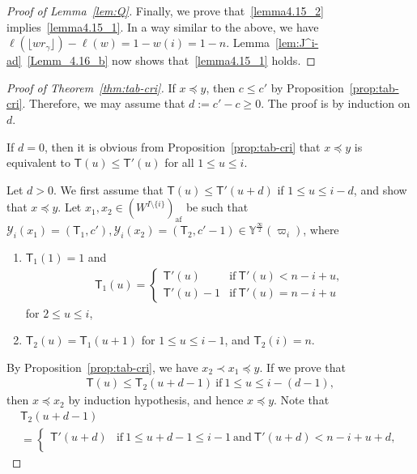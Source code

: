 \documentclass[10pt]{amsart}
\theoremstyle{definition}\newtheorem{defi}[theo]{Definition}
\theoremstyle{remark}\newtheorem{rema}[theo]{Remark}
\newcommand{\si}{\frac{\infty}{2}}
\DeclareMathOperator{\af}{af}
\begin{document}
\begin{proof}[Proof of Lemma~\ref{lem:Q}]
Finally, we prove that~\ref{lemma4.15_2} implies~\ref{lemma4.15_1}. 
In a way similar to the above, 
we have 
$\ell(\lfloor w r_{\gamma} \rfloor) - \ell(w) = 1 - w(i) = 1 - n$. 
Lemma~\ref{lem:J^i-ad}~\ref{Lemm_4.16_b} now shows that~\ref{lemma4.15_1} holds.
\end{proof}

\begin{proof}[Proof of Theorem~\ref{thm:tab-cri}]
If 
$x \preceq y$, 
then 
$c \leq c'$ 
by Proposition~\ref{prop:tab-cri}.
Therefore, we may assume that 
$d := c' - c \geq 0$. 
The proof is by induction on $d$. 

If $d = 0$, then it is obvious from Proposition~\ref{prop:tab-cri} that 
$x \preceq y$ 
is equivalent to 
$\mathsf{T}(u) \leq \mathsf{T}'(u)$
for all 
$1 \leq u \leq i$. 

Let $d > 0$. 
We first assume that 
$\mathsf{T}(u) \leq \mathsf{T}'(u+d)$ 
if 
$1 \leq u \leq i-d$, 
and show that 
$x \preceq y$. 
Let 
$x_1 , x_2 \in (W^{I \setminus \{ i \}})_{\af}$ 
be such that 
$\mathcal{Y}_i(x_1) = (\mathsf{T}_1 , c'), \mathcal{Y}_i(x_2) = (\mathsf{T}_2 , c'-1) \in \mathbb{Y}^{\si}(\varpi_i)$, 
where 
\begin{enumerate}[label=(\arabic*)]
\item
$\mathsf{T}_1(1) = 1$ and 
\begin{align}
\mathsf{T}_1(u) 
=
\begin{cases}
\mathsf{T}'(u) 
&
\text{if} \ 
\mathsf{T}'(u) < n-i+u, \\[2mm]
\mathsf{T}'(u) - 1
&
\text{if} \ 
\mathsf{T}'(u) = n-i+u
\end{cases}
\end{align}
for $2 \leq u \leq i$, 
\item
$\mathsf{T}_2(u) = \mathsf{T}_1(u+1)$ 
for 
$1 \leq u \leq i-1$, 
and 
$\mathsf{T}_2(i) = n$.
\end{enumerate}
By Proposition~\ref{prop:tab-cri}, 
we have 
$x_2 \prec x_1 \preceq y$. 
If we prove that 
\begin{align} \label{eq:T_2>T}
\mathsf{T}(u) \leq \mathsf{T}_2(u+d-1) \ 
\text{if} \ 
1 \leq u \leq i- (d-1), 
\end{align}
then 
$x \preceq x_2$
by induction hypothesis, 
and hence 
$x \preceq y$. 
Note that 
\begin{multline}
\mathsf{T}_2(u+d-1) \\
=
\begin{cases}
\mathsf{T}'(u+d) 
&
\text{if} \ 
1 \leq u+d-1 \leq i-1 \ 
\text{and} \ 
\mathsf{T}'(u+d) < n-i+u+d , \\%

\end{cases}
\end{multline}
\end{proof}
\end{document}
